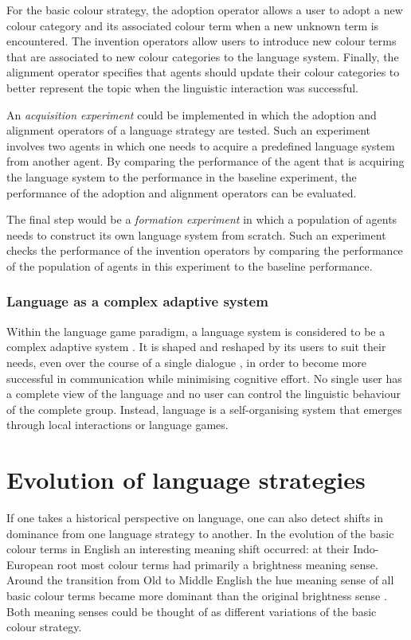 For the basic colour strategy, the adoption operator allows a user to
adopt a new colour category and its associated colour term when a new
unknown term is encountered. The invention operators allow users to
introduce new colour terms that are associated to new colour
categories to the language system. Finally, the alignment operator
specifies that agents should update their colour categories to better
represent the topic when the linguistic interaction was successful.

An \emph{acquisition experiment} could be implemented in which the
adoption and alignment operators of a language strategy are
tested. Such an experiment involves two agents in which one needs to
acquire a predefined language system from another agent. By comparing
the performance of the agent that is acquiring the language system to
the performance in the baseline experiment, the performance of the
adoption and alignment operators can be evaluated.

The final step would be a \emph{formation experiment} in which a
population of agents needs to construct its own language system from
scratch. Such an experiment checks the performance of the invention
operators by comparing the performance of the population of agents in
this experiment to the baseline performance.

\subsubsection*{Language as a complex adaptive system}
 
Within the language game paradigm, a language system is considered to
be a complex adaptive system \citep{steels00language}. It is shaped
and reshaped by its users to suit their needs, even over the course of
a single dialogue \citep{garrod94conversation}, in order to become
more successful in communication while minimising cognitive effort. No
single user has a complete view of the language and no user can
control the linguistic behaviour of the complete group. Instead,
language is a self-organising system that emerges through local
interactions or language games.

\section{Evolution of language strategies}

If one takes a historical perspective on language, one can also
detect shifts in dominance from one language strategy to another. In
the evolution of the basic colour terms in English an interesting
meaning shift occurred: at their Indo-European root most colour terms
had primarily a brightness meaning sense. Around the transition from
Old to Middle English the hue meaning sense of all basic colour terms became
more dominant than the original brightness sense
\citep{casson97shift}. Both meaning senses could be thought of as
different variations of the basic colour strategy.


